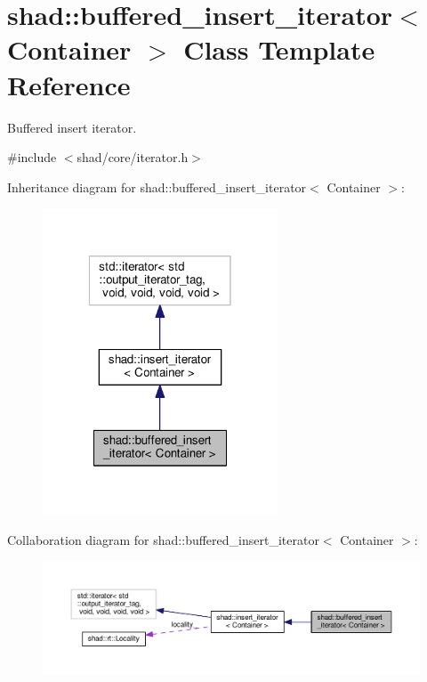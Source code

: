 \hypertarget{classshad_1_1buffered__insert__iterator}{\section{shad\-:\-:buffered\-\_\-insert\-\_\-iterator$<$ Container $>$ Class Template Reference}
\label{classshad_1_1buffered__insert__iterator}
}


Buffered insert iterator.  




{\ttfamily \#include $<$shad/core/iterator.\-h$>$}



Inheritance diagram for shad\-:\-:buffered\-\_\-insert\-\_\-iterator$<$ Container $>$\-:
\nopagebreak
\begin{figure}[H]
\begin{center}
\leavevmode
\includegraphics[width=198pt]{classshad_1_1buffered__insert__iterator__inherit__graph}
\end{center}
\end{figure}


Collaboration diagram for shad\-:\-:buffered\-\_\-insert\-\_\-iterator$<$ Container $>$\-:
\nopagebreak
\begin{figure}[H]
\begin{center}
\leavevmode
\includegraphics[width=350pt]{classshad_1_1buffered__insert__iterator__coll__graph}
\end{center}
\end{figure}
